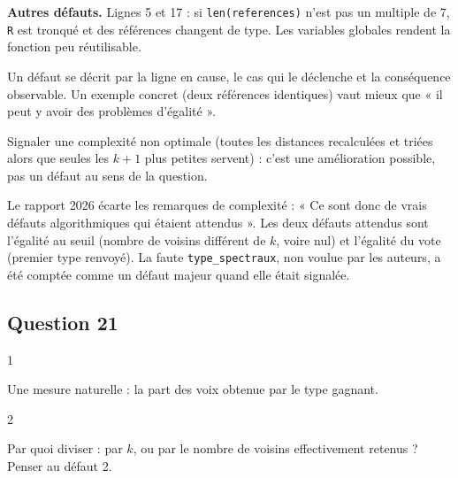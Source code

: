 \documentclass[11pt,a4paper]{article}
\begin{document}
\textbf{Autres défauts.} Lignes 5 et 17 : si \texttt{len(references)} n'est pas un multiple de 7, \texttt{R} est tronqué et des références changent de type. Les variables globales rendent la fonction peu réutilisable.

\begin{methode}

Un défaut se décrit par la ligne en cause, le cas qui le déclenche et la conséquence observable. Un exemple concret (deux références identiques) vaut mieux que « il peut y avoir des problèmes d'égalité ».

\end{methode}

\begin{piege}

Signaler une complexité non optimale (toutes les distances recalculées et triées alors que seules les \(k+1\) plus petites servent) : c'est une amélioration possible, pas un défaut au sens de la question.

\end{piege}

\begin{jury}

Le rapport 2026 écarte les remarques de complexité : « Ce sont donc de vrais défauts algorithmiques qui étaient attendus ». Les deux défauts attendus sont l'égalité au seuil (nombre de voisins différent de \(k\), voire nul) et l'égalité du vote (premier type renvoyé). La faute \texttt{type\_spectraux}, non voulue par les auteurs, a été comptée comme un défaut majeur quand elle était signalée.

\end{jury}

\hypertarget{question-21}{%
\subsection{Question 21}\label{question-21}}

\begin{indication}{1}

Une mesure naturelle : la part des voix obtenue par le type gagnant.

\end{indication}

\begin{indication}{2}

Par quoi diviser : par \(k\), ou par le nombre de voisins effectivement retenus ? Penser au défaut 2.

\end{indication}
\end{document}
